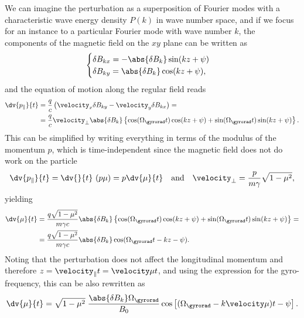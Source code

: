 We can imagine the perturbation as a superposition of Fourier modes with a characteristic
wave energy density $P(k)$ in wave number space, and if we focus for an instance to a
particular Fourier mode with wave number $k$, the components of the magnetic field on
the $xy$ plane can be written as
\begin{align*}
  \begin{cases}
    \delta B_{kx} = - \abs{\delta B_k} \sin(kz + \psi)\\
    \delta B_{ky} = \abs{\delta B_k} \cos(kz + \psi),
  \end{cases}
\end{align*}
and the equation of motion along the regular field reads
\begin{align*}
  \dv{p_\parallel}{t} & =
  \frac{q}{c} \left(\velocity_x \delta B_{ky} - \velocity_y \delta B_{kx}\right) =\\
  & = \frac{q}{c} \velocity_\perp \abs{\delta B_k}
  \left\{
    \cos(\Omega_\gyrorad t) \cos(kz + \psi) +
    \sin(\Omega_\gyrorad t) \sin(kz + \psi)
  \right\}.
\end{align*}
This can be simplified by writing everything in terms of the modulus of the momentum
$p$, which is time-independent since the magnetic field does not do work on the particle
\begin{align*}
  \dv{p_\parallel}{t} = \dv{}{t}\ (p \mu) = p \dv{\mu}{t} \quad \text{and}\quad
  \velocity_\perp = \frac{p}{m \gamma} \sqrt{1 - \mu^2},
\end{align*}
yielding
\begin{align*}
  \dv{\mu}{t} & = \frac{q \sqrt{1 - \mu^2}}{m \gamma c} \abs{\delta B_k}
  \left\{
    \cos(\Omega_\gyrorad t) \cos(kz + \psi) +
    \sin(\Omega_\gyrorad t) \sin(kz + \psi)
  \right\} =\\
  & = \frac{q \sqrt{1 - \mu^2}}{m \gamma c} \abs{\delta B_k}
  \cos(\Omega_\gyrorad t - kz - \psi).
\end{align*}
Noting that the perturbation does not affect the longitudinal momentum and therefore
$z = \velocity_\parallel t = \velocity\mu t$, and using the expression for the
gyro-frequency, this can be also rewritten as
\begin{align}\label{eq:pitch_angle_motion}
  \dv{\mu}{t} =
  \sqrt{1 - \mu^2} \; \frac{\abs{\delta B_k} \Omega_\gyrorad}{B_0}
  \cos \left[ (\Omega_\gyrorad - k\velocity\mu) t - \psi \right].
\end{align}

